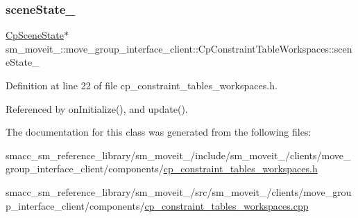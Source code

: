 \subsubsection{\texorpdfstring{scene\+State\+\_\+}{sceneState\_}}
{\footnotesize\ttfamily \hyperlink{classsm__moveit__4_1_1cl__perception__system_1_1CpSceneState}{Cp\+Scene\+State}$\ast$ sm\+\_\+moveit\+\_\+::move\+\_\+group\+\_\+interface\+\_\+client\+::\+Cp\+Constraint\+Table\+Workspaces\+::scene\+State\+\_\+\hspace{0.3cm}{\ttfamily [private]}}



Definition at line 22 of file cp\+\_\+constraint\+\_\+tables\+\_\+workspaces.\+h.



Referenced by on\+Initialize(), and update().



The documentation for this class was generated from the following files\+:\begin{DoxyCompactItemize}
\item 
smacc\+\_\+sm\+\_\+reference\+\_\+library/sm\+\_\+moveit\+\_/include/sm\+\_\+moveit\+\_/clients/move\+\_\+group\+\_\+interface\+\_\+client/components/\hyperlink{cp__constraint__tables__workspaces_8h}{cp\+\_\+constraint\+\_\+tables\+\_\+workspaces.\+h}\item 
smacc\+\_\+sm\+\_\+reference\+\_\+library/sm\+\_\+moveit\+\_/src/sm\+\_\+moveit\+\_/clients/move\+\_\+group\+\_\+interface\+\_\+client/components/\hyperlink{cp__constraint__tables__workspaces_8cpp}{cp\+\_\+constraint\+\_\+tables\+\_\+workspaces.\+cpp}\end{DoxyCompactItemize}
